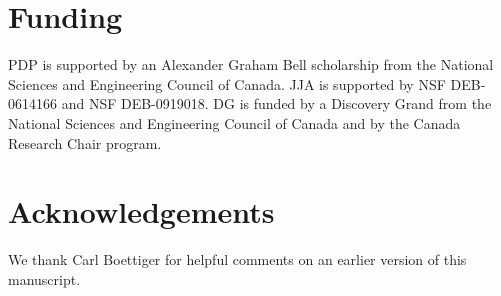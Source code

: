 \documentclass[letterpaper,twocolumn,superscriptaddress,showkeys]{revtex4-1}
\begin{document}
\section{Funding}

PDP is supported by an Alexander Graham Bell scholarship from the National
Sciences and Engineering Council of Canada. JJA is supported by NSF DEB-0614166
and NSF DEB-0919018. DG is funded by a Discovery Grand from the National
Sciences and Engineering Council of Canada and by the Canada Research Chair
program.

\section{Acknowledgements}

We thank Carl Boettiger for helpful comments on an earlier version of this
manuscript.

\newpage


\end{document}
